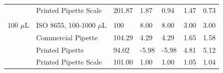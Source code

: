 \documentclass[10pt,letterpaper]{article}
\begin{document}
\begin{table}[!ht]
\begin{adjustwidth}{-2.25in}{0in}
\begin{tabular}{lllllll}
			& Printed Pipette Scale & 201.87  & 1.87             & 0.94         & 1.47         & 0.73          \\
			&                       &         &                  &              &              &               \\
			100 $\mu$L  & ISO 8655, 100-1000 $\mu$L & 100     & 8.00             & 8.00         & 3.00         & 3.00          \\
			& Commercial Pipette    & 104.29  & 4.29             & 4.29         & 1.65         & 1.58          \\
			& Printed Pipette       & 94.02   & -5.98            & -5.98        & 4.81         & 5.12          \\
			& Printed Pipette Scale & 101.00  & 1.00             & 1.00         & 1.05         & 1.04         
		\end{tabular}
	\end{adjustwidth}
\end{table}
\end{document}
